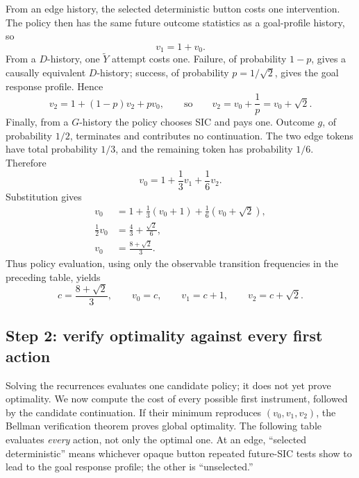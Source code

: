 \documentclass[11pt]{article}
\theoremstyle{definition}
\theoremstyle{remark}
\begin{document}
From an edge history, the selected deterministic button costs one
intervention.  The policy then has the same future outcome statistics as a
goal-profile history, so
\[
 v_1=1+v_0.
\]
From a \(D\)-history, one \(\widetilde Y\) attempt costs one.  Failure, of
probability \(1-p\), gives a causally equivalent \(D\)-history; success, of
probability \(p=1/\sqrt2\), gives the goal response profile.  Hence
\[
 v_2=1+(1-p)v_2+pv_0,
 \qquad\text{so}\qquad
 v_2=v_0+\frac1p=v_0+\sqrt2.
\]
Finally, from a \(G\)-history the policy chooses SIC and pays one.  Outcome
\(g\), of probability \(1/2\), terminates and contributes no continuation.
The two edge tokens have total probability \(1/3\), and the remaining token
has probability \(1/6\).  Therefore
\[
 v_0=1+\frac13v_1+\frac16v_2.
\]
Substitution gives
\begin{align*}
 v_0
 &=1+\frac13(v_0+1)+\frac16(v_0+\sqrt2),\\
 \frac12v_0&=\frac43+\frac{\sqrt2}{6},\\
 v_0&=\frac{8+\sqrt2}{3}.
\end{align*}
Thus policy evaluation, using only the observable transition frequencies in
the preceding table, yields
\[
 c=\frac{8+\sqrt2}{3},\qquad
 v_0=c,\qquad v_1=c+1,\qquad v_2=c+\sqrt2.
\]

\subsection{Step 2: verify optimality against every first action}

Solving the recurrences evaluates one candidate policy; it does not yet prove
optimality.  We now compute the cost of every possible first instrument,
followed by the candidate continuation.  If their minimum reproduces
\((v_0,v_1,v_2)\), the Bellman verification theorem proves global optimality.
The following table evaluates \emph{every} action, not only the optimal one.
At an edge, ``selected deterministic'' means whichever opaque button repeated
future-SIC tests show to lead to the goal response profile; the other is
``unselected.''
\end{document}
